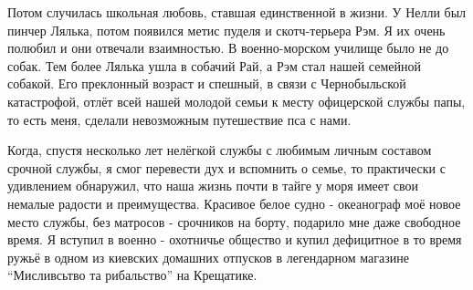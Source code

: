 \begin{multicols}{2} %
\setlength{\parindent}{0pt}









\end{multicols} %

Потом случилась школьная любовь, ставшая единственной в
жизни. У Нелли был пинчер Лялька, потом появился метис пуделя и скотч-терьера
Рэм. Я их очень полюбил и они отвечали взаимностью. В военно-морском училище
было не до собак. Тем более Лялька ушла в собачий Рай, а Рэм стал нашей
семейной собакой. Его преклонный возраст и спешный, в связи с Чернобыльской
катастрофой, отлёт всей нашей молодой семьи к месту офицерской службы папы, то
есть меня, сделали невозможным путешествие пса с нами. 

Когда, спустя несколько
лет нелёгкой службы с любимым личным составом срочной службы, я смог перевести
дух и вспомнить о семье, то практически с удивлением обнаружил, что наша жизнь
почти в тайге у моря имеет свои немалые радости и преимущества. Красивое белое
судно - океанограф моё новое место службы, без матросов - срочников на борту,
подарило мне даже свободное время. Я вступил в военно - охотничье общество и
купил дефицитное в то время ружьё в одном из киевских домашних отпусков в
легендарном магазине \enquote{Мисливсьтво та рибальство} на Крещатике. 

